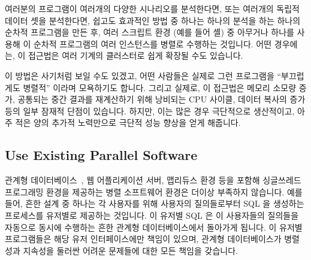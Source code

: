 여러분의 프로그램이 여러개의 다양한 시나리오를 분석한다면, 또는 여러개의 독립적
데이터 셋을 분석한다면, 쉽고도 효과적인 방법 중 하나는 하나의 분석을 하는
하나의 순차적 프로그램을 만든 후, 여러 스크립트 환경 (예를 들어  셸)
중 아무거나 하나를 사용해 이 순차적 프로그램의 여러 인스턴스를 병렬로 수행하는
것입니다.
어떤 경우에는, 이 접근법은 여러 기계의 클러스터로 쉽게 확장될 수도 있습니다.

이 방법은 사기처럼 보일 수도 있겠고, 어떤 사람들은 실제로 그런 프로그램을
``부끄럽게도 병렬적'' 이라며 모욕하기도 합니다.
그리고 실제로, 이 접근법은 메모리 소모량 증가, 공통되는 중간 결과를 재계산하기
위해 낭비되는 CPU 사이클, 데이터 복사의 증가 등의 일부 잠재적 단점이 있습니다.
하지만, 이는 많은 경우 극단적으로 생산적이고, 아주 적은 양의 추가적 노력만으로
극단적 성능 향상을 얻게 해줍니다.

\subsection{Use Existing Parallel Software}
\label{sec:intro:Use Existing Parallel Software}

관계형 데이터베이스~\cite{Date82}, 웹 어플리케이션 서버, 맵리듀스 환경 등을
포함해 싱글쓰레드 프로그래밍 환경을 제공하는 병렬 소프트웨어 환경은 더이상
부족하지 않습니다.
예를 들어, 흔한 설계 중 하나는 각 사용자를 위해 사용자의 질의들로부터 SQL 을
생성하는 프로세스를 유저별로 제공하는 것입니다.
이 유저별 SQL 은 이 사용자들의 질의들을 자동으로 동시에 수행하는 흔한 관계형
데이터베이스에서 돌아가게 됩니다.
이 유저별 프로그램들은 해당 유저 인터페이스에만 책임이 있으며, 관계형
데이터베이스가 병렬성과 지속성을 둘러싼 어려운 문제들에 대한 모든 책임을
갖습니다.

